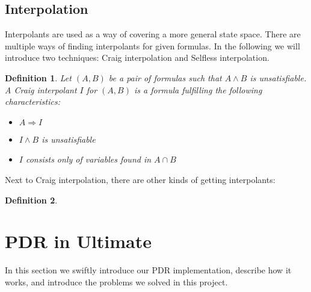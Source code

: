 \documentclass{article}
\newtheorem{mydef}{Definition}
\newcommand\mycom[1]{}
\newcommand\mycom[1]{#1}
\newcommand{\jw}[1]{\mycom{\todo[color=blue!40,inline]{\small JW: #1}}}
\begin{document}
	
	\pagebreak
		
	\subsection{Interpolation}
	Interpolants are used as a way of covering a more general state space. There are multiple ways of finding interpolants for given formulas.
	In the following we will introduce two techniques: Craig interpolation and Selfless interpolation. 
	\jw{citation needed}
	
	\begin{mydef}
		Let $(A, B)$ be a pair of formulas such that $A \land B$ is unsatisfiable. A Craig interpolant $I$ for $(A, B)$ is a formula fulfilling the following characteristics:
		\begin{itemize}
			\item $A \Rightarrow I$
			\item $I \land B$ is unsatisfiable
			\item $I$ consists only of variables found in $A \cap B$
		\end{itemize}
	\end{mydef}

	Next to Craig interpolation, there are other kinds of getting interpolants:
	\begin{mydef}
		\jw{Introduce Selfless interpolation}
	\end{mydef}
	\pagebreak
	
	\section{PDR in Ultimate}
	In this section we swiftly introduce our PDR implementation, describe how it works, and introduce the problems we solved in this project.
	
\end{document}
